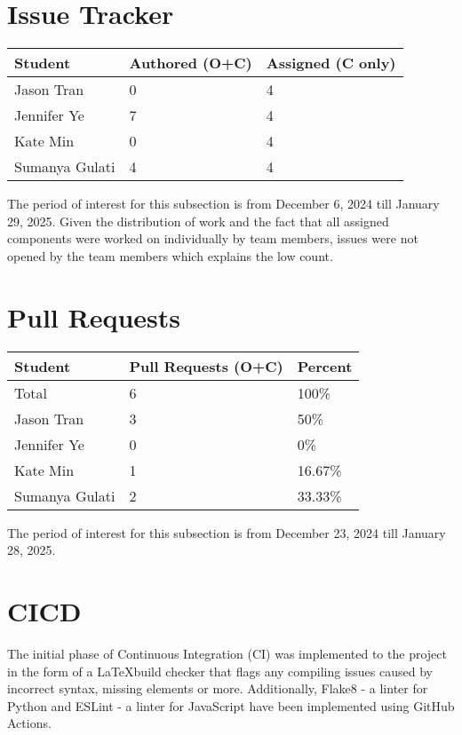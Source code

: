 \documentclass{article}
\begin{document}
\section{Issue Tracker}

\begin{table}[H]
\centering
\begin{tabular}{lll}
\toprule
\textbf{Student} & \textbf{Authored (O+C)} & \textbf{Assigned (C only)}\\
\midrule
Jason Tran & 0 & 4 \\
Jennifer Ye & 7 & 4 \\
Kate Min & 0 & 4 \\
Sumanya Gulati & 4 & 4 \\
\bottomrule
\end{tabular}
\end{table}

The period of interest for this subsection is from December 6, 2024 till January 29, 2025.
Given the distribution of work and the fact that all assigned components were worked on 
individually by team members, issues were not opened by the team members which explains the 
low count.

\section{Pull Requests}

\begin{table}[H]
\centering
\begin{tabular}{lll}
\toprule
\textbf{Student} & \textbf{Pull Requests (O+C)} & \textbf{Percent}\\
\midrule
Total & 6 & 100\% \\
Jason Tran & 3 & 50\% \\
Jennifer Ye & 0 & 0\% \\
Kate Min & 1 & 16.67\% \\
Sumanya Gulati & 2 & 33.33\% \\
\bottomrule
\end{tabular}
\end{table}

The period of interest for this subsection is from December 23, 2024 till January 28, 2025.

\section{CICD}

The initial phase of Continuous Integration (CI) was implemented to the project in the form 
of a \LaTeX build checker that flags any compiling issues caused by incorrect syntax, missing 
elements or more. Additionally, Flake8 - a linter for Python and ESLint - a linter for JavaScript have been
implemented using GitHub Actions.
\end{document}
